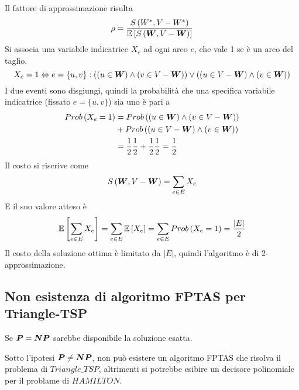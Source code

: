 Il fattore di approssimazione risulta
\begin{equation*}
    \rho = 
    \frac{
        S \left( W^*, V-W^* \right)
    }{
        \mathbb{E}\left[
            S \left( \bm{W} , V- \bm{W} \right)
        \right]
    }
\end{equation*}
Si associa una variabile indicatrice $X_e$ ad ogni arco $e$, che vale 1 se è un arco del taglio.
\begin{equation*}
    X_e = 1 \Leftrightarrow
    e = \left\{ u,v \right\}
    :
    \left( 
        \left( u \in \bm{W} \right)
        \wedge
        \left( v \in V - \bm{W} \right)
    \right)
    \vee
    \left( 
        \left( u \in V - \bm{W} \right)
        \wedge
        \left( v \in \bm{W} \right)
    \right)
\end{equation*}
I due eventi sono disgiungi, quindi
la probabilità che una specifica variabile indicatrice (fissato $e=\{u,v\}$) sia uno è pari a
\begin{align*}
    Prob \left( X_e = 1 \right)
    &= 
    Prob \left( 
        \left( u \in \bm{W} \right)
        \wedge
        \left( v \in V - \bm{W} \right)
    \right)
    \\
    &+
    Prob \left( 
        \left( u \in V - \bm{W} \right)
        \wedge
        \left( v \in \bm{W} \right)
    \right)
    \\
    &= 
    \frac{1}{2}
    \frac{1}{2}
    +
    \frac{1}{2}
    \frac{1}{2}
    =
    \frac{1}{2}
\end{align*}
Il costo si riscrive come
\begin{equation*}
    S \left( \bm{W} , V- \bm{W} \right)
    =
    \sum_{e \in E} X_e
\end{equation*}
E il suo valore atteso è
\begin{align*}
    \mathbb{E}\left[
        \sum_{e \in E} X_e
    \right]
    =
    \sum_{e \in E}
        \mathbb{E}\left[
            X_e
        \right]
    =
    \sum_{e \in E}
    Prob \left( X_e = 1 \right)
    = \frac{|E|}{2}
\end{align*}
Il costo della soluzione ottima è limitato da $|E|$, quindi l'algoritmo è di 2-approssimazione.

\subsection{Non esistenza di algoritmo FPTAS per Triangle-TSP}

Se $\bm{P} = \bm{NP}$ sarebbe disponibile la soluzione esatta.

Sotto l'ipotesi $\bm{P} \neq \bm{NP}$, non può esistere un algoritmo FPTAS che risolva il problema di $Triangle\_TSP$, altrimenti si potrebbe esibire un decisore polinomiale per il problame di $HAMILTON$.

